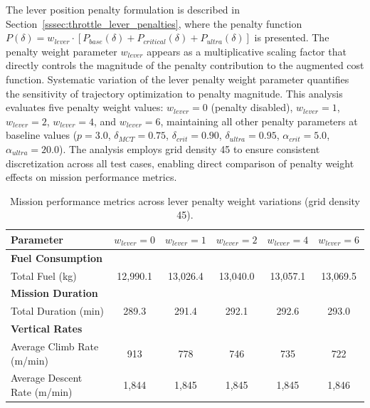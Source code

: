 The lever position penalty formulation is described in Section~\ref{sssec:throttle_lever_penalties}, where the penalty function $P(\delta) = w_{lever} \cdot [P_{base}(\delta) + P_{critical}(\delta) + P_{ultra}(\delta)]$ is presented. The penalty weight parameter $w_{lever}$ appears as a multiplicative scaling factor that directly controls the magnitude of the penalty contribution to the augmented cost function. Systematic variation of the lever penalty weight parameter quantifies the sensitivity of trajectory optimization to penalty magnitude. This analysis evaluates five penalty weight values: $w_{lever} = 0$ (penalty disabled), $w_{lever} = 1$, $w_{lever} = 2$, $w_{lever} = 4$, and $w_{lever} = 6$, maintaining all other penalty parameters at baseline values ($p = 3.0$, $\delta_{MCT} = 0.75$, $\delta_{crit} = 0.90$, $\delta_{ultra} = 0.95$, $\alpha_{crit} = 5.0$, $\alpha_{ultra} = 20.0$). The analysis employs grid density 45 to ensure consistent discretization across all test cases, enabling direct comparison of penalty weight effects on mission performance metrics.

\begin{table}[h]
    \centering
    \footnotesize
    \caption{Mission performance metrics across lever penalty weight variations (grid density 45).}
    \label{tab:lever_penalty_weight_variation}
    \begin{tabular}{l c c c c c}
        \hline
        Parameter & $w_{lever} = 0$ & $w_{lever} = 1$ & $w_{lever} = 2$ & $w_{lever} = 4$ & $w_{lever} = 6$ \\
        \hline
        \textbf{Fuel Consumption} & & & & & \\
        Total Fuel (kg) & 12{,}990.1 & 13{,}026.4 & 13{,}040.0 & 13{,}057.1 & 13{,}069.5 \\
        \hline
        \textbf{Mission Duration} & & & & & \\
        Total Duration (min) & 289.3 & 291.4 & 292.1 & 292.6 & 293.0 \\
        \hline
        \textbf{Vertical Rates} & & & & & \\
        Average Climb Rate (m/min) & 913 & 778 & 746 & 735 & 722 \\
        Average Descent Rate (m/min) & 1{,}844 & 1{,}845 & 1{,}845 & 1{,}845 & 1{,}846 \\
        \hline
    \end{tabular}
\end{table}

\newpage

